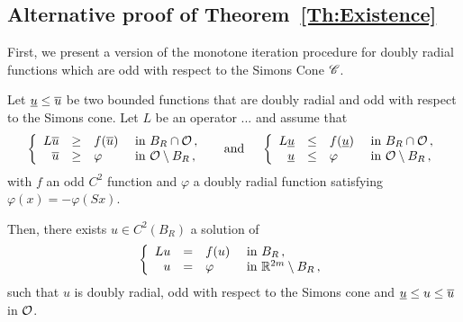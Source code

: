\subsection{Alternative proof of Theorem~\ref{Th:Existence}}

First, we present a version of the monotone iteration procedure for doubly radial functions which are odd with respect to the Simons Cone $\mathscr{C}$.

\begin{proposition}
	\label{Prop:MonotoneIterationOdd}
	Let $\underline{u} \leq \overline{u}$ be two bounded functions that are doubly radial and odd with respect to the Simons cone. Let $L$ be an operator ...  and assume that
	$$
	\left\{\begin{array}{rcll}
	L\overline{u} & \geq & f(\overline{u}) & \textrm{ in } B_R \cap \mathcal{O}\,, \\
	\overline{u} & \geq & \varphi & \textrm{ in } \mathcal{O} \setminus B_R\,, 
	\end{array} \right.
 \quad \textrm{ and } \quad 
	\left\{\begin{array}{rcll}
	L\underline{u} & \leq & f(\underline{u}) & \textrm{ in } B_R \cap \mathcal{O}\,, \\
	\underline{u} & \leq & \varphi & \textrm{ in } \mathcal{O} \setminus B_R\,, 
	\end{array} \right.
	$$
	with $f$ an odd $C^2$ function and $\varphi$ a doubly radial function satisfying $\varphi (x) = - \varphi(Sx)$.
	
	Then, there exists $u\in C^2(B_R)$ a solution of
	$$
	\left\{\begin{array}{rcll}
	Lu & = & f(u) & \textrm{ in } B_R\,, \\
	u &=& \varphi &  \textrm{ in } \mathbb{R}^{2m} \setminus B_R\,, 
	\end{array} \right.
	$$
	such that $u$ is doubly radial, odd with respect to the Simons cone and  $\underline{u} \leq u \leq \overline{u}$ in $\mathcal{O}$.
\end{proposition}

